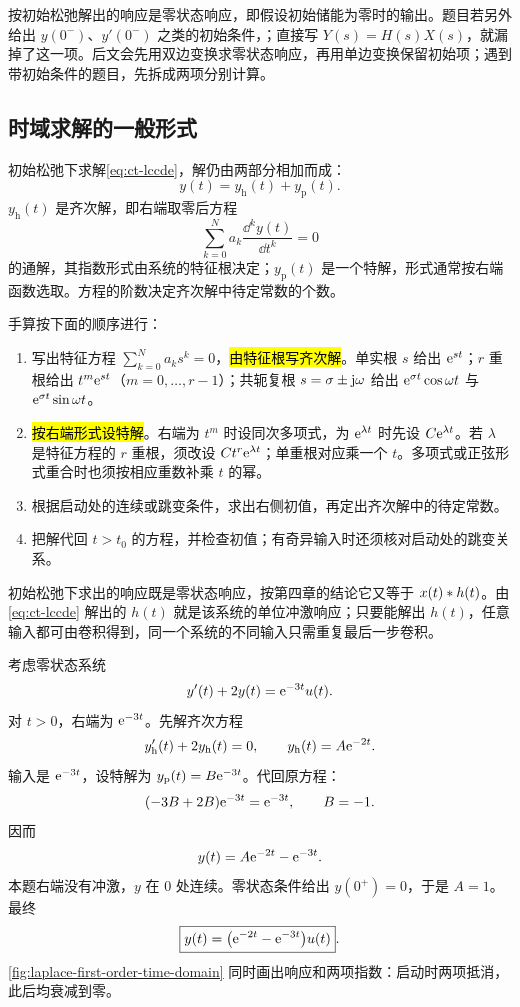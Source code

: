\begin{pitfall}[把零状态响应与全响应混为一谈]
  按初始松弛解出的响应是零状态响应，即假设初始储能为零时的输出。题目若另外给出 $y(0^-)$、$y'(0^-)$ 之类的初始条件，；直接写 $Y(s)=H(s)X(s)$，就漏掉了这一项。后文会先用双边变换求零状态响应，再用单边变换保留初始项；遇到带初始条件的题目，先拆成两项分别计算。
\end{pitfall}

\subsection{时域求解的一般形式}

初始松弛下求解\cref{eq:ct-lccde}，解仍由两部分相加而成：
\[
  y(t)=y_{\mathrm h}(t)+y_{\mathrm p}(t).
\]
$y_{\mathrm h}(t)$ 是齐次解，即右端取零后方程
\[
  \sum_{k=0}^{N}a_k\frac{\dd^k y(t)}{\dd t^k}=0
\]
的通解，其指数形式由系统的特征根决定；$y_{\mathrm p}(t)$ 是一个特解，形式通常按右端函数选取。方程的阶数决定齐次解中待定常数的个数。

手算按下面的顺序进行：

\begin{enumerate}
  \item 写出特征方程 $\sum_{k=0}^{N}a_ks^k=0$，\hl{由特征根写齐次解}。单实根 $s$ 给出 $\mathrm{e}^{st}$；$r$ 重根给出 $t^{m}\mathrm{e}^{st}$（$m=0,\ldots,r-1$）；共轭复根 $s=\sigma\pm\mathrm{j}\omega$ 给出 $\mathrm{e}^{\sigma t}\cos\omega t$ 与 $\mathrm{e}^{\sigma t}\sin\omega t$。
  \item \hl{按右端形式设特解}。右端为 $t^{m}$ 时设同次多项式，为 $\mathrm{e}^{\lambda t}$ 时先设 $C\mathrm{e}^{\lambda t}$。若 $\lambda$ 是特征方程的 $r$ 重根，须改设 $Ct^r\mathrm{e}^{\lambda t}$；单重根对应乘一个 $t$。多项式或正弦形式重合时也须按相应重数补乘 $t$ 的幂。
  \item 根据启动处的连续或跳变条件，求出右侧初值，再定出齐次解中的待定常数。
  \item 把解代回 $t>t_0$ 的方程，并检查初值；有奇异输入时还须核对启动处的跳变关系。
\end{enumerate}

\begin{remark}[与时域卷积的关系]
  初始松弛下求出的响应既是零状态响应，按第四章的结论它又等于 $x(t)\mathbin{\ast} h(t)$。由\cref{eq:ct-lccde} 解出的 $h(t)$ 就是该系统的单位冲激响应；只要能解出 $h(t)$，任意输入都可由卷积得到，同一个系统的不同输入只需重复最后一步卷积。
\end{remark}

\begin{example}[一阶方程的完整时域解法]
\label{eg:ct-first-order-time-domain}
  考虑零状态系统
  \[
    y'(t)+2y(t)=\mathrm{e}^{-3t}u(t).
  \]
  对 $t>0$，右端为 $\mathrm{e}^{-3t}$。先解齐次方程
  \[
    y_{\mathrm h}'(t)+2y_{\mathrm h}(t)=0,
    \qquad
    y_{\mathrm h}(t)=A\mathrm{e}^{-2t}.
  \]
  输入是 $\mathrm{e}^{-3t}$，设特解为 $y_{\mathrm p}(t)=B\mathrm{e}^{-3t}$。代回原方程：
  \[
    (-3B+2B)\mathrm{e}^{-3t}=\mathrm{e}^{-3t},
    \qquad B=-1.
  \]
  因而
  \[
    y(t)=A\mathrm{e}^{-2t}-\mathrm{e}^{-3t}.
  \]
  本题右端没有冲激，$y$ 在 $0$ 处连续。零状态条件给出 $y(0^+)=0$，于是 $A=1$。最终
  \[
    \boxed{y(t)=\bigl(\mathrm{e}^{-2t}-\mathrm{e}^{-3t}\bigr)u(t)}.
  \]
  \cref{fig:laplace-first-order-time-domain} 同时画出响应和两项指数：启动时两项抵消，此后均衰减到零。
\end{example}

